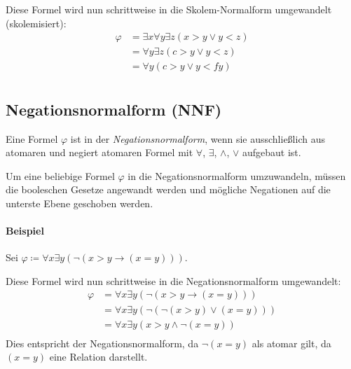 \documentclass[a4paper, 11pt, accentcolor = tud3b]{tudreport}
\begin{document}
                    Diese Formel wird nun schrittweise in die Skolem-Normalform umgewandelt (skolemisiert):
                    \begin{align*}
                        \varphi &= \exists x \forall y \exists z (x > y \lor y < z) \tag{1. Existenzquantor} \\
                                &= \forall y \exists z (c > y \lor y < z) \tag{2. Existenzquantor} \\
                                &= \forall y (c > y \lor y < fy) \tag{Skolem-Normalform} \\
                    \end{align*}

            \subsection{Negationsnormalform (NNF)}
                Eine Formel $ \varphi $ ist in der \textit{Negationsnormalform}, wenn sie ausschließlich aus atomaren und negiert atomaren Formel mit $ \forall $, $ \exists $, $ \land $, $ \lor $ aufgebaut ist.

                Um eine beliebige Formel $ \varphi $ in die Negationsnormalform umzuwandeln, müssen die booleschen Gesetze angewandt werden und mögliche Negationen auf die unterste Ebene geschoben werden.

                \paragraph{Beispiel}
                    Sei $ \varphi \coloneqq \forall x \exists y (\lnot (x > y \rightarrow (x = y))) $.

                    Diese Formel wird nun schrittweise in die Negationsnormalform umgewandelt:
                    \begin{align*}
                        \varphi &= \forall x \exists y (\lnot (x > y \rightarrow (x = y))) \\
                                &= \forall x \exists y (\lnot (\lnot (x > y) \lor (x = y))) \\
                                &= \forall x \exists y (x > y \land \lnot (x = y)) \\
                    \end{align*}
                    Dies entspricht der Negationsnormalform, da $ \lnot (x = y) $ als atomar gilt, da $ (x = y) $ eine Relation darstellt.
\end{document}
